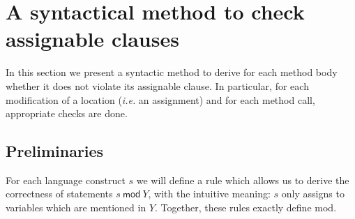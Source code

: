 \documentclass[a4paper]{llncs}
\newcommand{\java}{\textsc{Java}}
\newcommand{\MOD}[2]{\ensuremath{\mathit{#1}\:\mathsf{mod}\:\ensuremath{\mathit{#2}}}}
\begin{document}














\section{A syntactical method to check assignable clauses}
\label{sec-syn-met-che-ass-cla}

In this section we present a syntactic method to derive for each
method body whether it does not violate its assignable clause. In
particular, for each modification of a location (\emph{i.e.} an
assignment) and for each method call, appropriate checks are done.


\subsection{Preliminaries}
For each language construct \(s\) we will define a rule
which allows us to derive the correctness of statements
\MOD{s}{Y}, with the intuitive meaning: \(s\) only assigns
to variables which are mentioned in \(Y\). Together, these rules
exactly define \textsf{mod}.
\end{document}
